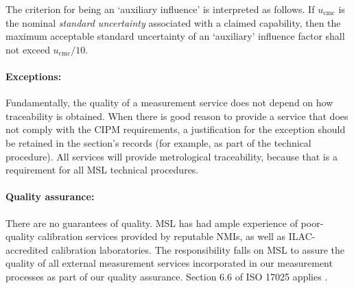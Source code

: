{The criterion for being an `auxiliary influence' is interpreted as follows. If $u_\mathrm{cmc}$ is the nominal \textit{standard uncertainty} associated with a claimed capability, then the maximum acceptable standard uncertainty of an `auxiliary' influence factor shall not exceed $u_\mathrm{cmc} / 10$. 

\paragraph{Exceptions:}  
Fundamentally, the quality of a measurement service does not depend on how traceability is obtained.
When there is good reason to provide a service that does not comply with the CIPM requirements, a justification for the exception should be retained in the section's records (for example, as part of the technical procedure). All services will provide metrological traceability, because that is a requirement for all MSL technical procedures.

\paragraph{Quality assurance:}
There are no guarantees of quality. MSL has had ample experience of poor-quality calibration services provided by reputable NMIs, as well as ILAC-accredited calibration laboratories. The responsibility falls on MSL to assure the quality of all external measurement services incorporated in our measurement processes as part of our quality assurance. Section 6.6 of ISO 17025 applies \cite{ISO_17025}.
  
}

